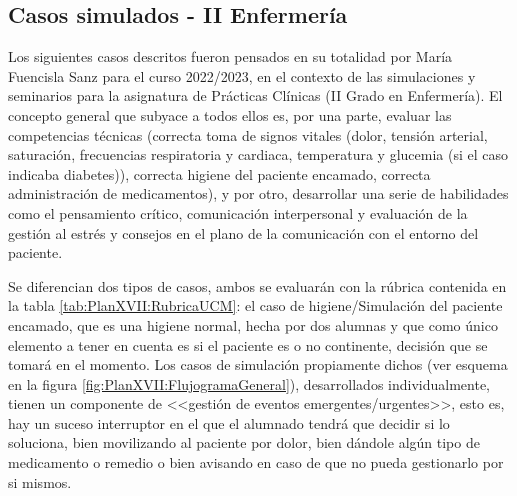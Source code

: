 \subsection{Casos simulados - II Enfermería}
Los siguientes casos descritos fueron pensados en su totalidad por María Fuencisla Sanz para el curso 2022/2023, en el contexto de las simulaciones y seminarios para la asignatura de Prácticas Clínicas (II Grado en Enfermería). El concepto general que subyace a todos ellos es, por una parte, evaluar las competencias técnicas (correcta toma de signos vitales (dolor, tensión arterial, saturación, frecuencias respiratoria y cardiaca, temperatura y glucemia (si el caso indicaba diabetes)), correcta higiene del paciente encamado, correcta administración de medicamentos), y por otro, desarrollar una serie de habilidades como el pensamiento crítico, comunicación interpersonal y evaluación de la gestión al estrés y consejos en el plano de la comunicación con el entorno del paciente.

Se diferencian dos tipos de casos, ambos se evaluarán con la rúbrica contenida en la tabla \ref{tab:PlanXVII:RubricaUCM}: el caso de higiene/Simulación del paciente encamado, que es una higiene normal, hecha por dos alumnas y que como único elemento a tener en cuenta es si el paciente es o no continente, decisión que se tomará en el momento. Los casos de simulación propiamente dichos (ver esquema en la figura \ref{fig:PlanXVII:FlujogramaGeneral}), desarrollados individualmente, tienen un componente de <<gestión de eventos emergentes/urgentes>>, esto es, hay un suceso interruptor en el que el alumnado tendrá que decidir si lo soluciona, bien movilizando al paciente por dolor, bien dándole algún tipo de medicamento o remedio o bien avisando en caso de que no pueda gestionarlo por si mismos. 

